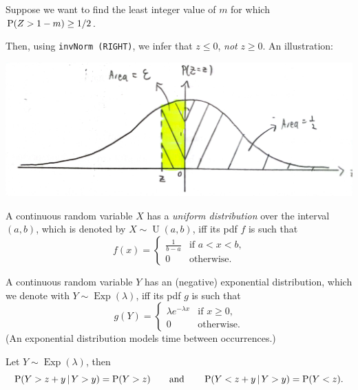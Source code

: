 \documentclass[../Notes.tex]{subfiles}
\begin{document}
\begin{example}{}{}
  Suppose we want to find the least integer value of \(m\) for which \(\operatorname{P}(Z>1-m)\geq 1/2\).

  Then, using \texttt{invNorm (RIGHT)}, we infer that \(z\leq 0\), \emph{not} \(z\geq 0\). An illustration: 
  \begin{center}
    \includegraphics[width=\textwidth]{../images/Special-Continuous-Random-Variables-Example-Illustration.jpg}
  \end{center}
\end{example}
\begin{definition}{}{}
  A continuous random variable \(X\) has a \emph{uniform distribution} over the interval \((a,b)\), which is denoted by \(X \sim \operatorname{U}(a,b)\), iff its pdf \(f\) is such that
    \[f(x)=\begin{cases}
      \frac{1}{b-a} &\text{if \(a<x<b\),}\\
      0 &\text{otherwise.}
    \end{cases}\] 
\end{definition}
\begin{definition}{}{}
  A continuous random variable \(Y\) has an (negative) exponential distribution, which we denote with \(Y\sim \operatorname{Exp}(\lambda)\), iff its pdf \(g\) is such that
    \[g(Y)=
    \begin{cases}
      \lambda e^{-\lambda x} &\text{if \(x\geq 0\)},\\
      0 &\text{otherwise.}
    \end{cases}\]
  (An exponential distribution models time between occurrences.)
\end{definition}
\begin{note}
  Let \(Y \sim \operatorname{Exp}(\lambda)\), then
  \[\operatorname{P}(Y>z+y \,\vert\, Y>y)=\operatorname{P}(Y>z) \qquad\text{and}\qquad\operatorname{P}(Y<z+y \,\vert\, Y>y)=\operatorname{P}(Y<z).\]
\end{note}
\end{document}
